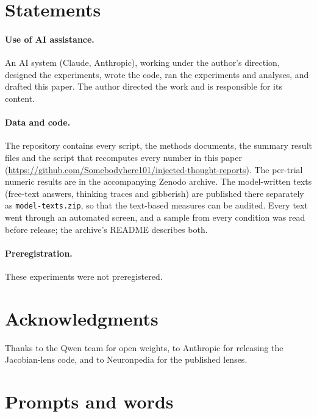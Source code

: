 \documentclass[11pt]{article}
\begin{document}
\section*{Statements}

\paragraph{Use of AI assistance.} An AI system (Claude, Anthropic), working under the author's direction, designed the experiments, wrote the code, ran the experiments and analyses, and drafted this paper. The author directed the work and is responsible for its content.

\paragraph{Data and code.} The repository contains every script, the methods documents, the summary result files and the script that recomputes every number in this paper (\url{https://github.com/Somebodyhere101/injected-thought-reports}). The per-trial numeric results are in the accompanying Zenodo archive. The model-written texts (free-text answers, thinking traces and gibberish) are published there separately as \texttt{model-texts.zip}, so that the text-based measures can be audited. Every text went through an automated screen, and a sample from every condition was read before release; the archive's README describes both.

\paragraph{Preregistration.} These experiments were not preregistered.

\section*{Acknowledgments}
Thanks to the Qwen team for open weights, to Anthropic for releasing the Jacobian-lens code, and to Neuronpedia for the published lenses.




\appendix

\section{Prompts and words}\label{app:prompts}
\end{document}

